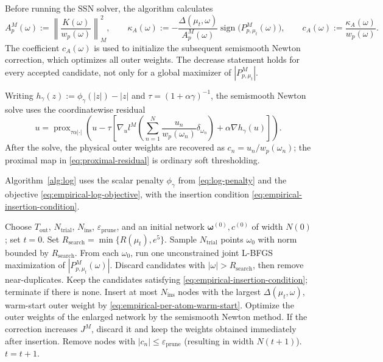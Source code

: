 \documentclass[11pt]{amsart}
\theoremstyle{definition}
\theoremstyle{remark}
\DeclareMathOperator{\sign}{sign}
\DeclareMathOperator{\prox}{prox}
\begin{document}
Before running the SSN solver, the algorithm calculates
\begin{equation}
\label{eq:empirical-per-atom-warm-start}
	A_p^M(\omega):=
	\left\|\frac{K(\omega)}{w_p(\omega)}\right\|_M^2,
	\qquad
	\kappa_A(\omega):=-\frac{\Delta(\mu_t,\omega)}{A_p^M(\omega)}
	\sign\bigl(P^M_{p,\mu_t}(\omega)\bigr),
	\qquad
	c_A(\omega):=\frac{\kappa_A(\omega)}{w_p(\omega)}.
\end{equation}
The coefficient $c_A(\omega)$ is used to
initialize the subsequent semismooth Newton correction, which optimizes all
outer weights. The decrease statement holds for every accepted candidate,
not only for a global maximizer of $|P^M_{p,\mu_t}|$.

Writing $h_\gamma(z):=\phi_\gamma(|z|)-|z|$ and
$\tau=(1+\alpha\gamma)^{-1}$, the semismooth Newton solve uses the
coordinatewise residual
\begin{equation}
\label{eq:proximal-residual}
	u=\prox_{\tau\alpha|\cdot|}
	\left(u-\tau\left[\nabla_ul^M
	\left(\sum_{n=1}^N
	\frac{u_n}{w_p(\omega_n)}\delta_{\omega_n}\right)
	+\alpha\nabla h_\gamma(u)\right]\right).
\end{equation}
After the solve, the physical outer weights are recovered as
$c_n=u_n/w_p(\omega_n)$; the proximal map in
\eqref{eq:proximal-residual} is ordinary soft thresholding.

Algorithm~\ref{alg:log} uses the scalar penalty
$\phi_\gamma$ from \eqref{eq:log-penalty} and the objective
\eqref{eq:empirical-log-objective}, with the insertion condition
\eqref{eq:empirical-insertion-condition}.

\begin{algorithm}[htbp]
\caption{Iterative node insertion for $J^M$}
\label{alg:log}
\begin{algorithmic}[1]
\State Choose $T_{\mathrm{out}}$, $N_{\mathrm{trial}}$, $N_{\mathrm{ins}}$,
$\varepsilon_{\mathrm{prune}}$, and an initial network
$\boldsymbol\omega^{(0)},c^{(0)}$ of width $N(0)$; set $t=0$.
\State Set $R_{\mathrm{search}}=\min\{R(\mu_t),e^5\}$. Sample
$N_{\mathrm{trial}}$ points $\omega_0$ with norm bounded by $R_{\mathrm{search}}$.
\State From each $\omega_0$, run one unconstrained joint L-BFGS maximization of
$|P^M_{p,\mu_t}(\omega)|$.
\State Discard candidates with $|\omega|>R_{\mathrm{search}}$, then remove near-duplicates.
\State Keep the candidates satisfying
\eqref{eq:empirical-insertion-condition}; terminate if there is none.
\State Insert at most $N_{\mathrm{ins}}$ nodes with the largest
$\Delta(\mu_t,\omega)$, warm-start outer weight by
\eqref{eq:empirical-per-atom-warm-start}.
\State Optimize the outer weights of the enlarged network by the semismooth
Newton method. If the correction increases $J^M$, discard it and keep the
weights obtained immediately after insertion.
\State Remove nodes with $|c_n|\le\varepsilon_{\mathrm{prune}}$ (resulting in
width $N(t+1)$).
\State $t = t + 1$.
\EndWhile
\end{algorithmic}
\end{algorithm}
\end{document}
